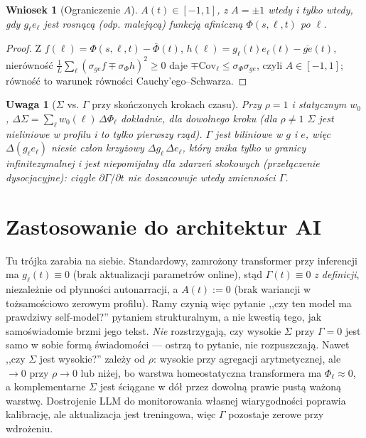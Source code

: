 \documentclass[11pt]{article}
\newtheorem*{remark}{Uwaga}
\newtheorem{proposition}{Wniosek}
\begin{document}
\begin{proposition}[Ograniczenie $A$]
$A(t)\in[-1,1]$, z $A=\pm1$ wtedy i tylko wtedy, gdy $g_\ell e_\ell$ jest rosnącą (odp. malejącą) funkcją afiniczną $\Phi(s,\ell,t)$ po $\ell$.
\end{proposition}
\begin{proof}
Z $f(\ell)=\Phi(s,\ell,t)-\bar\Phi(t)$, $h(\ell)=g_\ell(t)e_\ell(t)-\overline{ge}(t)$, nierówność $\frac1L\sum_\ell(\sigma_{ge}f\mp\sigma_\Phi h)^2\ge0$ daje $\mp\mathrm{Cov}_\ell\le\sigma_\Phi\sigma_{ge}$, czyli $A\in[-1,1]$; równość to warunek równości Cauchy'ego--Schwarza.
\end{proof}

\begin{remark}[$\Sigma$ vs. $\Gamma$ przy skończonych krokach czasu]
Przy $\rho=1$ i statycznym $w_0$, $\Delta\Sigma=\sum_\ell w_0(\ell)\,\Delta\Phi_\ell$ dokładnie, dla dowolnego kroku (dla $\rho\neq1$ $\Sigma$ jest nieliniowe w profilu i to tylko pierwszy rząd). $\Gamma$ jest biliniowe w $g$ i $e$, więc $\Delta(g_\ell e_\ell)$ niesie człon krzyżowy $\Delta g_\ell\,\Delta e_\ell$, który znika tylko w granicy infinitezymalnej i jest niepomijalny dla zdarzeń skokowych (przełączenie dysocjacyjne): ciągłe $\partial\Gamma/\partial t$ nie doszacowuje wtedy zmienności $\Gamma$.
\end{remark}

\section{Zastosowanie do architektur AI}\label{sec:ai}

Tu trójka zarabia na siebie. Standardowy, zamrożony transformer przy inferencji ma $g_\ell(t)\equiv0$ (brak aktualizacji parametrów online), stąd $\Gamma(t)\equiv0$ \emph{z definicji}, niezależnie od płynności autonarracji, a $A(t):=0$ (brak wariancji w tożsamościowo zerowym profilu). Ramy czynią więc pytanie ,,czy ten model ma prawdziwy self-model?'' pytaniem strukturalnym, a nie kwestią tego, jak samoświadomie brzmi jego tekst. \emph{Nie} rozstrzygają, czy wysokie $\Sigma$ przy $\Gamma=0$ jest samo w sobie formą świadomości --- ostrzą to pytanie, nie rozpuszczają. Nawet ,,czy $\Sigma$ jest wysokie?'' zależy od $\rho$: wysokie przy agregacji arytmetycznej, ale $\to0$ przy $\rho\to0$ lub niżej, bo warstwa homeostatyczna transformera ma $\Phi_\ell\approx0$, a komplementarne $\Sigma$ jest ściągane w dół przez dowolną prawie pustą ważoną warstwę. Dostrojenie LLM do monitorowania własnej wiarygodności \cite{predmetacog2026} poprawia kalibrację, ale aktualizacja jest treningowa, więc $\Gamma$ pozostaje zerowe przy wdrożeniu.
\end{document}

